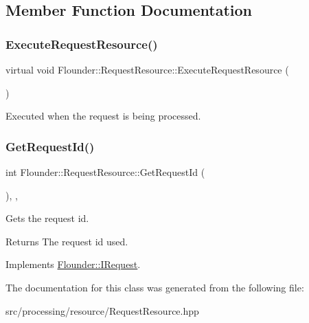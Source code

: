 \subsection{Member Function Documentation}
\mbox{\label{class_flounder_1_1_request_resource_a93b0065fbbed0f41e77206b9df1e216c}} 
\subsubsection{\texorpdfstring{Execute\+Request\+Resource()}{ExecuteRequestResource()}}
{\footnotesize\ttfamily virtual void Flounder\+::\+Request\+Resource\+::\+Execute\+Request\+Resource (\begin{DoxyParamCaption}{ }\end{DoxyParamCaption})\hspace{0.3cm}{\ttfamily [pure virtual]}}



Executed when the request is being processed. 

\mbox{\label{class_flounder_1_1_request_resource_ac116ffcad0790316a97603e874eb6586}} 
\subsubsection{\texorpdfstring{Get\+Request\+Id()}{GetRequestId()}}
{\footnotesize\ttfamily int Flounder\+::\+Request\+Resource\+::\+Get\+Request\+Id (\begin{DoxyParamCaption}{ }\end{DoxyParamCaption})\hspace{0.3cm}{\ttfamily [inline]}, {\ttfamily [override]}, {\ttfamily [virtual]}}



Gets the request id. 

\begin{DoxyReturn}{Returns}
The request id used. 
\end{DoxyReturn}


Implements \hyperlink{class_flounder_1_1_i_request_a13fa86b3ecc0b67101179291fdfca9bc}{Flounder\+::\+I\+Request}.



The documentation for this class was generated from the following file\+:\begin{DoxyCompactItemize}
\item 
src/processing/resource/Request\+Resource.\+hpp\end{DoxyCompactItemize}
